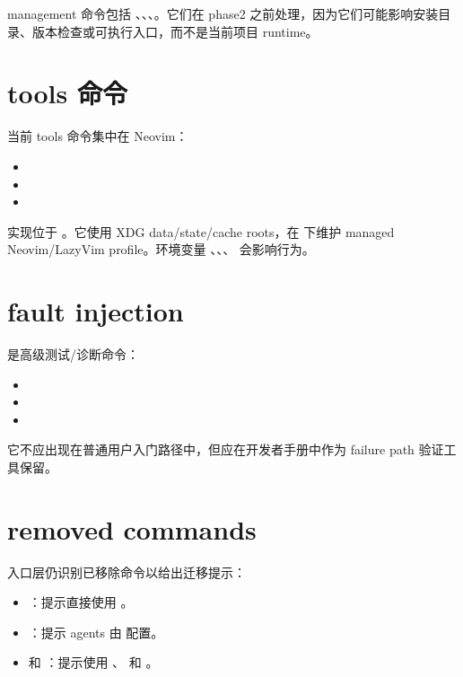 management 命令包括 、、、。它们在 phase2 之前处理，因为它们可能影响安装目录、版本检查或可执行入口，而不是当前项目 runtime。

\section{tools 命令}

当前 tools 命令集中在 Neovim：

\begin{itemize}
  \item {}
  \item {}
  \item {}
\end{itemize}

实现位于 。它使用 XDG data/state/cache roots，在  下维护 managed Neovim/LazyVim profile。环境变量 、、、 会影响行为。

\section{fault injection}

 是高级测试/诊断命令：

\begin{itemize}
  \item {}
  \item {}
  \item {}
\end{itemize}

它不应出现在普通用户入门路径中，但应在开发者手册中作为 failure path 验证工具保留。

\section{removed commands}

入口层仍识别已移除命令以给出迁移提示：

\begin{itemize}
  \item {}：提示直接使用 。
  \item {}：提示 agents 由  配置。
  \item {} 和 ：提示使用 、 和 。
\end{itemize}


